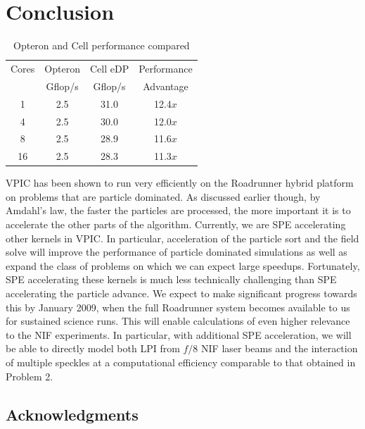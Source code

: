 \documentclass[journal,twoside]{IEEEtran}
\begin{document}
\section{Conclusion}

\begin{table}
\caption{Opteron and Cell performance compared}
\begin{center}
\begin{tabular}{c c c c}
\hline
\hline
Cores & Opteron & Cell eDP & Performance \\
      & Gflop/s &  Gflop/s &  Advantage  \\
\hline
    1 &     2.5 &     31.0 &     12.4$x$ \\
    4 &     2.5 &     30.0 &     12.0$x$ \\
    8 &     2.5 &     28.9 &     11.6$x$ \\
   16 &     2.5 &     28.3 &     11.3$x$ \\
\hline
\end{tabular}
\end{center}
\label{tbl:opteron-cell-compared}
\end{table}

VPIC has been shown to run very efficiently on the Roadrunner hybrid
platform on problems that are particle dominated.  As discussed
earlier though, by Amdahl's law, the faster the particles are
processed, the more important it is to accelerate the other parts of
the algorithm.  Currently, we are SPE accelerating other kernels in
VPIC.  In particular, acceleration of the particle sort and the field
solve will improve the performance of particle dominated simulations
as well as expand the class of problems on which we can expect large
speedups.  Fortunately, SPE accelerating these kernels is much less
technically challenging than SPE accelerating the particle advance.
We expect to make significant progress towards this by January 2009,
when the full Roadrunner system becomes available to us for sustained
science runs.  This will enable calculations of even higher relevance
to the NIF experiments.  In particular, with additional SPE
acceleration, we will be able to directly model both LPI from $f/8$
NIF laser beams and the interaction of multiple speckles at a
computational efficiency comparable to that obtained in Problem 2.

\subsection*{Acknowledgments}
\end{document}
